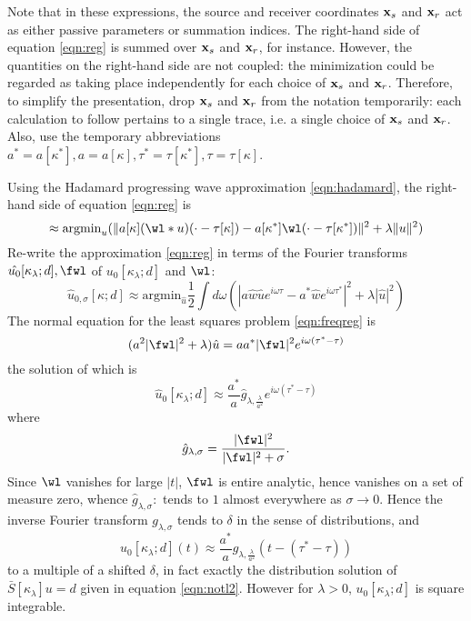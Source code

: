 Note that in these expressions, the source and receiver coordinates
${\bf x}_s$ and ${\bf x}_r$ act as either passive parameters or
summation indices. The right-hand side of equation \ref{eqn:reg} is
summed over ${\bf x}_s$ and ${\bf x}_r$, for instance. However, the
quantities on the right-hand side are not coupled: the minimization
could be regarded as taking place independently for each choice of
${\bf x}_s$ and ${\bf x}_r$. Therefore, to simplify the presentation,
drop ${\bf x}_s$ and ${\bf x}_r$ from the notation temporarily: each
calculation to follow pertains to a single trace, i.e. a single choice
of ${\bf x}_s$ and ${\bf x}_r$.  Also, use the
temporary abbreviations
$a^*=a[\kappa^*], a=a[\kappa], \tau^*=\tau[\kappa^*], \tau=\tau[\kappa]$.

Using the Hadamard progressing wave approximation \ref{eqn:hadamard},
the right-hand side of equation \ref{eqn:reg} is 
$$
\approx \mbox{argmin}_u (\|a[\kappa](\wl*u)(\cdot-\tau[\kappa])-a[\kappa^*]\wl(\cdot-\tau[\kappa^*])\|^2 + \lambda\|u\|^2)
$$
Re-write the approximation \ref{eqn:reg} in terms of the Fourier transforms $\hat{u_0}[\kappa_{\lambda};d],\fwl$ of $u_0[\kappa_{\lambda};d]$ and $\wl$:
\begin{equation}
  \label{eqn:freqreg}
\hat{u}_{0,\sigma}[\kappa;d] \approx \mbox{argmin}_{\hat{u}}\frac{1}{2}\int d\omega \left(|a\hat{w}\hat{u}e^{i\omega \tau}-a^*\hat{w}e^{i\omega\tau^*}|^2 + \lambda |\hat{u}|^2\right)
\end{equation}
The normal equation for the least squares problem \ref{eqn:freqreg} is
\[
(a^2 |\fwl|^2 +\lambda)\hat{u} = a a^*|\fwl|^2e^{i\omega(\tau^*-\tau)}
\]
the solution of which is
\begin{equation}
  \label{eqn:hatuf}
\hat{u}_0[\kappa_{\lambda};d] \approx \frac{a^*}{a}\hat{g}_{\lambda,\frac{\lambda}{a^2}} e^{i\omega(\tau^*-\tau)}
\end{equation}
where
\begin{equation}
  \label{eqn:hatgf}
\hat{g}_{\lambda,\sigma} = \frac{|\fwl|^2}{|\fwl|^2 + \sigma}.
\end{equation}
Since $\wl$ vanishes for large $|t|$, $\fwl$ is entire analytic,
hence vanishes on a set of measure zero, whence $\hat{g}_{\lambda,\sigma}:$ tends to $1$ almost everywhere as $\sigma \rightarrow 0$. Hence the inverse Fourier transform $g_{\lambda,\sigma}$ tends to $\delta$ in the sense of distributions, and 
$$
u_0[\kappa_{\lambda};d](t) \approx \frac{a^*}{a}g_{\lambda,\frac{\lambda}{a^2}}(t-(\tau^*-\tau))
$$
to a multiple of a shifted $\delta$, in fact exactly the distribution
solution of $\bar{S}[\kappa_{\lambda}]u=d$ given in equation \ref{eqn:notl2}. However for $\lambda>0$, $u_0[\kappa_{\lambda};d]$ is square integrable.

